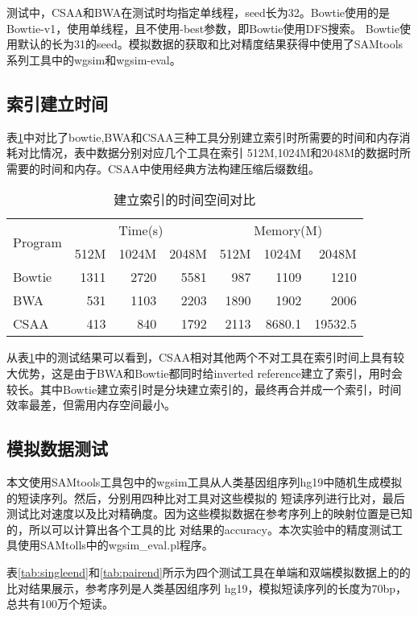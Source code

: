 测试中，CSAA和BWA在测试时均指定单线程，seed长为32。Bowtie使用的是Bowtie-v1，使用单线程，且不使用-best参数，即Bowtie使用DFS搜索。
Bowtie使用默认的长为31的seed。模拟数据的获取和比对精度结果获得中使用了SAMtools系列工具中的wgsim和wgsim-eval。

\subsection{索引建立时间}
表\ref{tab:tab1}中对比了bowtie,BWA和CSAA三种工具分别建立索引时所需要的时间和内存消耗对比情况，表中数据分别对应几个工具在索引
512M,1024M和2048M的数据时所需要的时间和内存。CSAA中使用经典方法构建压缩后缀数组。

\begin{table}[htbp]
    \caption{建立索引的时间空间对比}
    \label{tab:tab1}
    \centering
    \begin{tabular}{lrrrrrr}
        \hline
        \multirow{2}{*}{Program} & \multicolumn{3}{c}{Time(s)} & \multicolumn{3}{c}{Memory(M)}\\
        \cline{2-4}
        \cline{5-7}
        & 512M &1024M &2048M &512M &1024M &2048M\\
        \hline
        Bowtie&1311 &2720 &5581 &987 &1109 &1210 \\
        BWA&531 &1103 &2203 &1890 &1902 &2006 \\
        CSAA&413 &840 &1792 &2113 &8680.1 &19532.5 \\
        \hline
    \end{tabular}
\end{table}

从表\ref{tab:tab1}中的测试结果可以看到，CSAA相对其他两个不对工具在索引时间上具有较大优势，这是由于BWA和Bowtie都同时给inverted
reference建立了索引，用时会较长。其中Bowtie建立索引时是分块建立索引的，最终再合并成一个索引，时间效率最差，但需用内存空间最小。

\subsection{模拟数据测试}
本文使用SAMtools工具包中的wgsim工具从人类基因组序列hg19中随机生成模拟的短读序列。然后，分别用四种比对工具对这些模拟的
短读序列进行比对，最后测试比对速度以及比对精确度。因为这些模拟数据在参考序列上的映射位置是已知的，所以可以计算出各个工具的比
对结果的accuracy。本次实验中的精度测试工具使用SAMtolls中的wgsim\_eval.pl程序。

表\ref{tab:singleend}和\ref{tab:pairend}所示为四个测试工具在单端和双端模拟数据上的的比对结果展示，参考序列是人类基因组序列
hg19，模拟短读序列的长度为70bp，总共有100万个短读。

